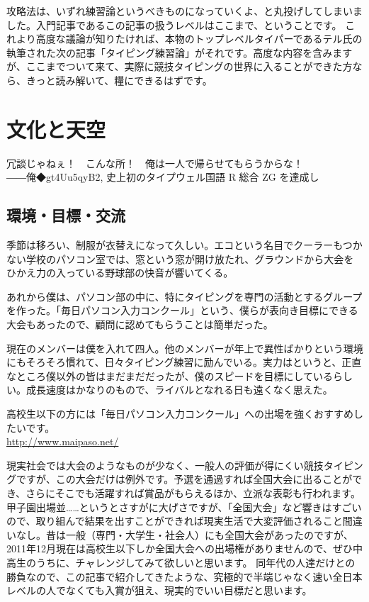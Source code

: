 \begin{screen}
攻略法は、いずれ練習論というべきものになっていくよ、と丸投げしてしまいました。入門記事であるこの記事の扱うレベルはここまで、ということです。
これより高度な議論が知りたければ、本物のトップレベルタイパーであるテル氏の執筆された次の記事「タイピング練習論」がそれです。高度な内容を含みますが、ここまでついて来て、実際に競技タイピングの世界に入ることができた方なら、きっと読み解いて、糧にできるはずです。
\end{screen}

\section{文化と天空}
\begin{screen}
冗談じゃねぇ！　こんな所！　俺は一人で帰らせてもらうからな！\\
――俺◆gt4Uu5qyB2, 史上初のタイプウェル国語 R 総合 ZG を達成し
\end{screen}

\subsection{環境・目標・交流}
季節は移ろい、制服が衣替えになって久しい。エコという名目でクーラーもつかない学校のパソコン室では、窓という窓が開け放たれ、グラウンドから大会をひかえ力の入っている野球部の快音が響いてくる。

あれから僕は、パソコン部の中に、特にタイピングを専門の活動とするグループを作った。「毎日パソコン入力コンクール」という、僕らが表向き目標にできる大会もあったので、顧問に認めてもらうことは簡単だった。

現在のメンバーは僕を入れて四人。他のメンバーが年上で異性ばかりという環境にもそろそろ慣れて、日々タイピング練習に励んでいる。実力はというと、正直なところ僕以外の皆はまだまだだったが、僕のスピードを目標にしているらしい。成長速度はかなりのもので、ライバルとなれる日も遠くなく思えた。

\begin{screen}
高校生以下の方には「毎日パソコン入力コンクール」への出場を強くおすすめしたいです。\\
\url{http://www.maipaso.net/}

現実社会では大会のようなものが少なく、一般人の評価が得にくい競技タイピングですが、この大会だけは例外です。予選を通過すれば全国大会に出ることができ、さらにそこでも活躍すれば賞品がもらえるほか、立派な表彰も行われます。
甲子園出場並……というとさすがに大げさですが、「全国大会」など響きはすごいので、取り組んで結果を出すことができれば現実生活で大変評価されること間違いなし。昔は一般（専門・大学生・社会人）にも全国大会があったのですが、2011年12月現在は高校生以下しか全国大会への出場権がありませんので、ぜひ中高生のうちに、チャレンジしてみて欲しいと思います。
同年代の人達だけとの勝負なので、この記事で紹介してきたような、究極的で半端じゃなく速い全日本レベルの人でなくても入賞が狙え、現実的でいい目標だと思います。
\end{screen}

